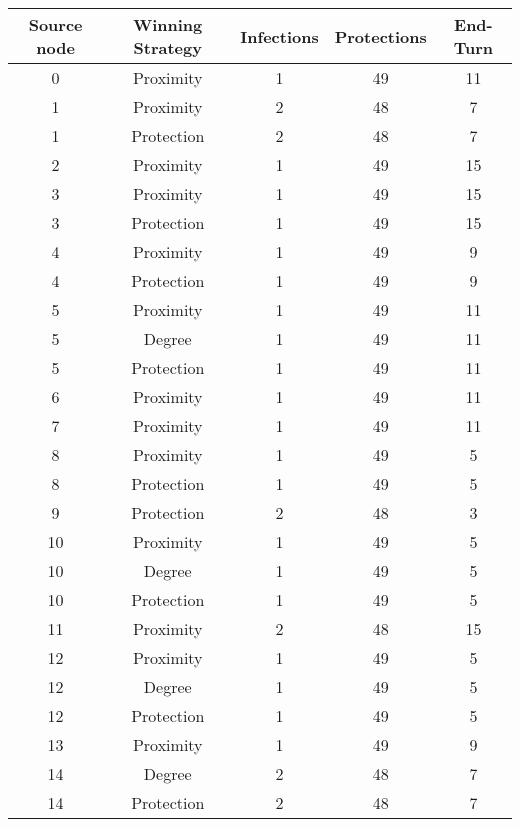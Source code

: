 \documentclass[results.tex]{subfiles}
\begin{document}
\begin{center}
  \begin{tabular}{| c || c | c | c | c |}
    \hline
    {\bfseries Source node} & {\bfseries Winning Strategy} & {\bfseries Infections} & {\bfseries Protections} & {\bfseries End-Turn} \\  %
    \hline\hline
    0 & Proximity & 1 & 49 & 11 \\ 
    \hline
    1 & Proximity & 2 & 48 & 7 \\ 
    \hline
    1 & Protection & 2 & 48 & 7 \\ 
    \hline
    2 & Proximity & 1 & 49 & 15 \\ 
    \hline
    3 & Proximity & 1 & 49 & 15 \\ 
    \hline
    3 & Protection & 1 & 49 & 15 \\ 
    \hline
    4 & Proximity & 1 & 49 & 9 \\ 
    \hline
    4 & Protection & 1 & 49 & 9 \\ 
    \hline
    5 & Proximity & 1 & 49 & 11 \\ 
    \hline
    5 & Degree & 1 & 49 & 11 \\ 
    \hline
    5 & Protection & 1 & 49 & 11 \\ 
    \hline
    6 & Proximity & 1 & 49 & 11 \\ 
    \hline
    7 & Proximity & 1 & 49 & 11 \\ 
    \hline
    8 & Proximity & 1 & 49 & 5 \\ 
    \hline
    8 & Protection & 1 & 49 & 5 \\ 
    \hline
    9 & Protection & 2 & 48 & 3 \\ 
    \hline
    10 & Proximity & 1 & 49 & 5 \\ 
    \hline
    10 & Degree & 1 & 49 & 5 \\ 
    \hline
    10 & Protection & 1 & 49 & 5 \\ 
    \hline
    11 & Proximity & 2 & 48 & 15 \\ 
    \hline
    12 & Proximity & 1 & 49 & 5 \\ 
    \hline
    12 & Degree & 1 & 49 & 5 \\ 
    \hline
    12 & Protection & 1 & 49 & 5 \\ 
    \hline
    13 & Proximity & 1 & 49 & 9 \\ 
    \hline
    14 & Degree & 2 & 48 & 7 \\ 
    \hline
    14 & Protection & 2 & 48 & 7 \\ 
    \hline

\end{tabular}
\end{center}
\end{document}
